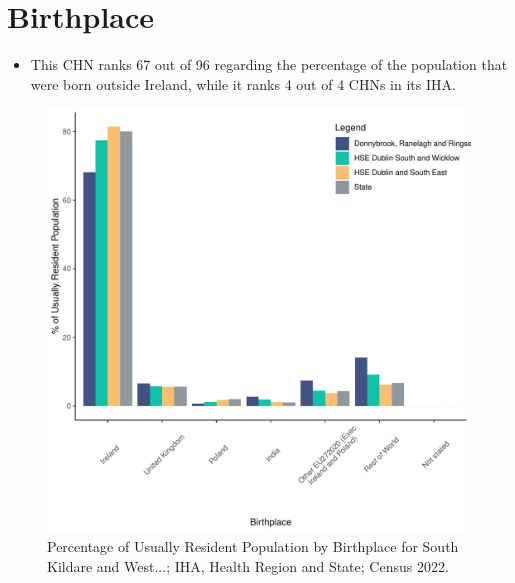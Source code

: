 \documentclass{article}
\begin{document}
\section{Birthplace}\label{sect:Birth}
\begin{itemize}
\item This CHN ranks  67 out of 96 regarding the percentage of the population that were born outside Ireland, while it ranks  4 out of 4 CHNs in its IHA.
\end{itemize}
\begin{figure}[H]
	\centering
	\includegraphics[width = 130mm]{../figures/BirthED.pdf}
	\caption{Percentage of Usually Resident Population by Birthplace for South Kildare and West...; IHA, Health Region and State; Census 2022.}
	\label{fig:vbnv}
	\end{figure}
	
\end{document}
